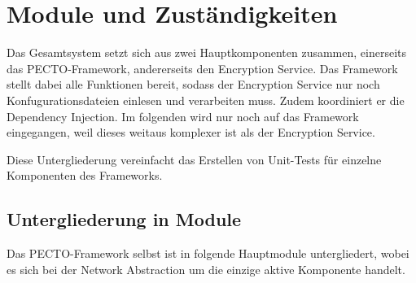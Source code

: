 \documentclass[a4paper, 11pt, ngerman, fleqn]{article}
\begin{document}
\section{Module und Zuständigkeiten}

Das Gesamtsystem setzt sich aus zwei Hauptkomponenten zusammen, einerseits das PECTO-Framework, andererseits den Encryption Service.
Das Framework stellt dabei alle Funktionen bereit, sodass der Encryption Service nur noch Konfugurationsdateien einlesen und verarbeiten muss. Zudem koordiniert er die Dependency Injection.
Im folgenden wird nur noch auf das Framework eingegangen, weil dieses weitaus komplexer ist als der Encryption Service.

Diese Untergliederung vereinfacht das Erstellen von Unit-Tests für einzelne Komponenten des Frameworks. 

\subsection{Untergliederung in Module}

Das PECTO-Framework selbst ist in folgende Hauptmodule untergliedert, wobei es sich bei der Network Abstraction um die einzige aktive Komponente handelt.

\end{document}
